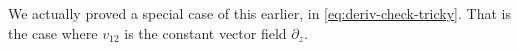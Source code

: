\documentclass[12pt,letterpaper,reqno]{amsart}
\numberwithin{equation}{section}
\newcommand{\cL}{\ensuremath{\mathcal L}}
\newcommand{\I}{{\mathrm i}}
\newcommand{\vertex}{\mathcal{V}}
\DeclareMathOperator{\Res}{Res}
\begin{document}
We actually proved a special case of this earlier, in \eqref{eq:deriv-check-tricky}. 
That is the case where $v_{12}$ is the constant vector field $\partial_z$. 


\end{document}
